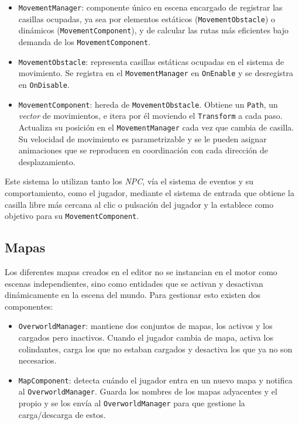 \begin{itemize}
	\item \texttt{MovementManager}: componente único en escena encargado de registrar las casillas ocupadas, ya sea por elementos estáticos (\texttt{MovementObstacle}) o dinámicos (\texttt{MovementComponent}), y de calcular las rutas más eficientes bajo demanda de los \texttt{MovementComponent}. 
	\item \texttt{MovementObstacle}: representa casillas estáticas ocupadas en el sistema de movimiento. Se registra en el \texttt{MovementManager} en \texttt{OnEnable} y se desregistra en \texttt{OnDisable}. 
	\item \texttt{MovementComponent}: hereda de \texttt{MovementObstacle}. Obtiene un \texttt{Path}, un \textit{vector} de movimientos, e itera por él moviendo el \texttt{Transform} a cada paso. Actualiza su posición en el \texttt{MovementManager} cada vez que cambia de casilla. Su velocidad de movimiento es parametrizable y se le pueden asignar animaciones que se reproducen en coordinación con cada dirección de desplazamiento. 
\end{itemize}

Este sistema lo utilizan tanto los \textit{NPC}, vía el sistema de eventos y su comportamiento, como el jugador, mediante el sistema de entrada que obtiene la casilla libre más cercana al clic o pulsación del jugador y la establece como objetivo para su \texttt{MovementComponent}. 

\subsection{Mapas}
Los diferentes mapas creados en el editor no se instancian en el motor como escenas independientes, sino como entidades que se activan y desactivan dinámicamente en la escena del mundo. Para gestionar esto existen dos componentes:

\begin{itemize}
	\item \texttt{OverworldManager}: mantiene dos conjuntos de mapas, los activos y los cargados pero inactivos. Cuando el jugador cambia de mapa, activa los colindantes, carga los que no estaban cargados y desactiva los que ya no son necesarios.
	\item \texttt{MapComponent}: detecta cuándo el jugador entra en un nuevo mapa y notifica al \texttt{OverworldManager}. Guarda los nombres de los mapas adyacentes y el propio y se los envía al \texttt{OverworldManager} para que gestione la carga/descarga de estos.
\end{itemize}

